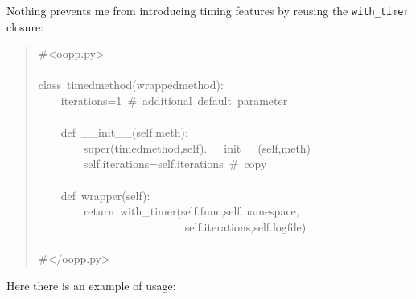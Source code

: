 \documentclass[10pt,english]{article}
\begin{document}
Nothing prevents me from introducing timing features by reusing the 
\texttt{with{\_}timer} closure:
\begin{quote}
\begin{ttfamily}\begin{flushleft}
\mbox{{\#}<oopp.py>}\\
\mbox{}\\
\mbox{class~timedmethod(wrappedmethod):}\\
\mbox{~~~~iterations=1~{\#}~additional~default~parameter}\\
\mbox{}\\
\mbox{~~~~def~{\_}{\_}init{\_}{\_}(self,meth):}\\
\mbox{~~~~~~~~super(timedmethod,self).{\_}{\_}init{\_}{\_}(self,meth)}\\
\mbox{~~~~~~~~self.iterations=self.iterations~{\#}~copy}\\
\mbox{}\\
\mbox{~~~~def~wrapper(self):}\\
\mbox{~~~~~~~~return~with{\_}timer(self.func,self.namespace,}\\
\mbox{~~~~~~~~~~~~~~~~~~~~~~~~~~self.iterations,self.logfile)}\\
\mbox{}\\
\mbox{{\#}</oopp.py>}
\end{flushleft}\end{ttfamily}
\end{quote}

Here there is an example of usage:
\end{document}
